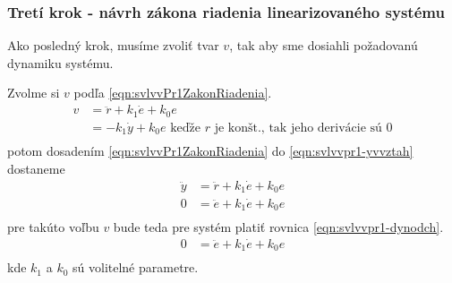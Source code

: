 \documentclass[../main.tex]{subfiles}
\begin{document}
    \subsubsection*{Tretí krok - návrh zákona riadenia linearizovaného systému}
    Ako posledný krok, musíme zvoliť tvar $v$, tak aby sme dosiahli požadovanú dynamiku systému.
    
    Zvolme si $v$ podľa \cref{eqn:svlvvPr1ZakonRiadenia}.
	\begin{equation}
	\begin{aligned}
	 v &= \ddot{r}  +k_1 \dot{e} + k_0 e \\
	   &= -k_1 \dot{y} + k_0 e \text{ keďže $r$ je konšt., tak jeho derivácie sú 0}\\
	   \end{aligned}
	\label{eqn:svlvvPr1ZakonRiadenia}
	\end{equation}
    potom dosadením \cref{eqn:svlvvPr1ZakonRiadenia} do \cref{eqn:svlvvpr1-yvvztah} dostaneme 
	\begin{equation*}
	\begin{aligned}
	 \ddot{y} &= \ddot{r}  +k_1 \dot{e} + k_0 e \\
	 0 &= \ddot{e}  + k_1 \dot{e} + k_0 e \\
	\end{aligned}
	\end{equation*}
    pre takúto voľbu $v$ bude teda pre systém platiť rovnica \cref{eqn:svlvvpr1-dynodch}.
    \begin{equation}
        \begin{aligned}
	        0 &= \ddot{e}  + k_1 \dot{e} + k_0 e \\
        \end{aligned}
        \label{eqn:svlvvpr1-dynodch}
    \end{equation} 
    kde $k_1$ a $k_0$ sú volitelné parametre. 
\end{document}
